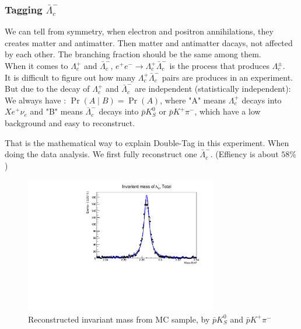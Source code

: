 \documentclass{beamer}
\begin{document}
\subsubsection{Tagging $\bar{\Lambda}_c^-$}
\begin{frame}
    We can tell from symmetry, when electron and positron annihilations, they creates matter and antimatter. Then matter and antimatter dacays, not affected by each other. The branching fraction should be the same among them.\\
    \vspace{0.2in}
    When it comes to $\Lambda_c^+$ and $\bar{\Lambda}_c^-$, $e^+e^-\rightarrow \Lambda_c^+\bar{\Lambda}_c^-$ is the process that produces $\Lambda_c^\pm$. \\
    \vspace{0.2in}
    It is difficult to figure out how many $\Lambda_c^+\bar{\Lambda}_c^-$ pairs are produces in an experiment. But due to the decay of $\Lambda_c^+$ and $\bar{\Lambda}_c^-$ are independent (statistically independent):\\
    \vspace{0.2in}
    We always have : $\Pr(A\mid B)=\Pr(A)$, where "A" means $\Lambda_c^+$ decays into $X e^+ \nu_e$ and "B" means $\bar{\Lambda}_c^-$ decays into $\bar{p} K^0_S$ or $\bar{p} K^+ \pi^-$, which have a low background and easy to reconstruct.
\end{frame}

\begin{frame}
    That is the mathematical way to explain Double-Tag in this experiment. When doing the data analysis. We first fully reconstruct one $\bar{\Lambda}_c^-$. (Effiency is about $58\%$)
    \begin{figure}
        \centering
        \includegraphics[width = 0.75\textwidth]{Overallim.pdf}
        \caption{Reconstructed invariant mass from MC sample, by $\bar{p} K^0_S$ and $\bar{p} K^+ \pi^-$}
        \label{fig: mBC data}
      \end{figure}
\end{frame}
\end{document}
